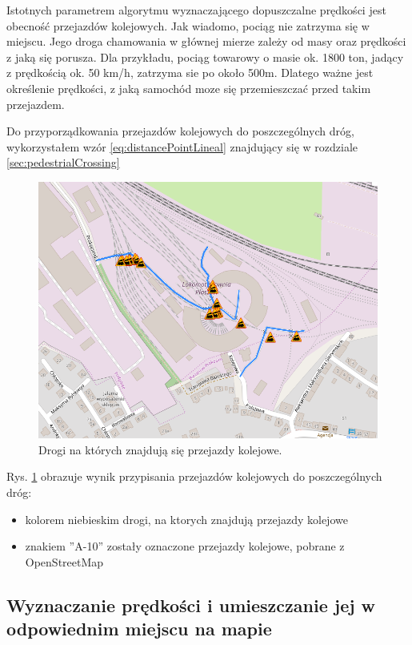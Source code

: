 Istotnych parametrem algorytmu wyznaczającego dopuszczalne prędkości jest obecność przejazdów kolejowych. Jak wiadomo, pociąg nie zatrzyma się w miejscu. Jego droga chamowania w głównej mierze zależy od masy oraz prędkości z jaką się porusza. Dla przykładu, pociąg towarowy o masie ok. 1800 ton, jadący z prędkością ok. 50 km/h, zatrzyma sie po około 500m. Dlatego ważne jest określenie prędkości, z jaką samochód moze się przemieszczać przed takim przejazdem.

Do przyporządkowania przejazdów kolejowych do poszczególnych dróg, wykorzystałem wzór \ref{eq:distancePointLineal} znajdujący się w rozdziale \ref{sec:pedestrialCrossing}


\begin{figure}[h]
\caption{Drogi na których znajdują się przejazdy kolejowe.}
\label{sec:PrzejazdyKolejowe}
\centering
\includegraphics[width=1.0\textwidth]{railCrossing}
\end{figure}

Rys. \ref{sec:PrzejazdyKolejowe} obrazuje wynik przypisania przejazdów kolejowych do poszczególnych dróg:
\begin{itemize}
\item kolorem niebieskim drogi, na ktorych znajdują przejazdy kolejowe
\item znakiem ''A-10'' zostały oznaczone przejazdy kolejowe, pobrane z OpenStreetMap
\end{itemize}

\newpage
\subsection{Wyznaczanie prędkości i umieszczanie jej w odpowiednim miejscu na mapie}

